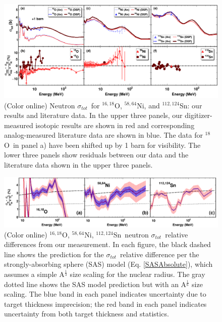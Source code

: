 \documentclass[twocolumn,secnumarabic,amssymb, nobibnotes, aps, prl,
superscriptaddress, nobalancelastpage]{revtex4}
\newcommand{\tot}{\ensuremath{\sigma_{tot}}}
\newcommand{\oEight}{\ensuremath{^{18}}O}
\newcommand{\oSixEight}{\ensuremath{^{16,18}}O}
\newcommand{\niEightFour}{\ensuremath{^{58,64}}N\lowercase{i}}
\newcommand{\snTwelveFour}{\ensuremath{^{112,124}}S\lowercase{n}}
\begin{document}
\begin{figure}[tb]
    \centering
    \includegraphics[width=\textwidth]{figures/SixPanel.png}
    \caption[Neutron \tot\ for \oSixEight, \niEightFour, and \snTwelveFour: our results and literature data]
    {(Color online) Neutron \tot\ for \oSixEight, \niEightFour, and \snTwelveFour: our results 
        and literature data.  In the upper three panels, our digitizer-measured
        isotopic results are shown in red and
        corresponding analog-measured literature data \cite{Finlay1993, 
        Perey1972, Vaughn1965, Salisbury1965, Perey1993, Dukarevich1967,
        Harper1982, Timokhov1989, Rapaport1980} are shown in blue.
        The data for \oEight\ in panel a) have been
        shifted up by 1 barn for visibility.
        The lower three panels show residuals between our data and the
        literature data shown in the upper three panels.
    }
    \label{SixPanel}
\end{figure}

\begin{figure}[tb]
    \centering
    \includegraphics[width=\textwidth]{figures/ThreePanelRelDiff.png}
    \caption[\oSixEight, \niEightFour, \snTwelveFour\ neutron \tot\ relative difference]
    {
        (Color online) \oSixEight, \niEightFour, \snTwelveFour\ neutron \tot\ relative differences
        from our measurement. In each figure, the black dashed line shows the 
        prediction for the \tot\ relative difference per the strongly-absorbing 
        sphere (SAS) model (Eq. \ref{SASAbsolute}), which assumes a simple 
        A$^{\frac{1}{3}}$ size scaling for the nuclear radius.
        The gray dotted line shows the
        SAS model prediction but with an
        A$^{\frac{1}{6}}$ size scaling. The blue band in each panel indicates
        uncertainty due to target thickness imprecision;
        the red band in each panel
        indicates uncertainty from both target thickness and statistics.
    }
    \label{ThreePanelRelDiff}
\end{figure}
\end{document}
